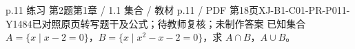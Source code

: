 \par\noindent\begin{minipage}{\linewidth}
\begin{bankitem}{p.11 练习 第2题}{第1章 / 1.1 集合 / 教材 p.11 / PDF 第18页}{XJ-B1-C01-PR-P011-Y1484}{已对照原页转写题干及公式；待教师复核；未制作答案}
已知集合 $A=\{x\mid x-2=0\}$，$B=\{x\mid x^2-x-2=0\}$，求 $A\cap B$，$A\cup B$。
\end{bankitem}
\end{minipage}\par\medskip
